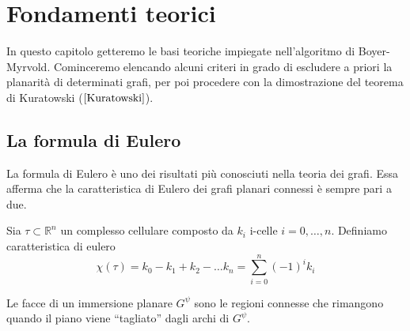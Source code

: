 \chapter{Fondamenti teorici}
In questo capitolo getteremo le basi teoriche impiegate nell'algoritmo di Boyer-Myrvold. Cominceremo elencando alcuni criteri in grado di escludere a priori la planarità di determinati grafi, per poi procedere con la dimostrazione del teorema di Kuratowski (\(\ref{Kuratowski}\)).
\section{La formula di Eulero}
La formula di Eulero è uno dei risultati più conosciuti nella teoria dei grafi. Essa afferma che la caratteristica di Eulero dei grafi planari connessi è sempre pari a due.
\begin{definizione}\label{caratteristica-eulero}
    Sia \(\tau \subset \mathbb{R}^n\) un complesso cellulare composto da \(k_i\) i-celle \(i=0,\dots,n\). Definiamo caratteristica di eulero
    \begin{equation}
        \chi(\tau) = k_0 - k_1 + k_2 - \dots k_n = \sum_{i=0}^{n}{(-1)}^i k_i
    \end{equation}
\end{definizione}
\begin{definizione}[Facce]
    Le facce di un immersione planare \(G^\psi\) sono le regioni connesse che rimangono quando il piano viene “tagliato” dagli archi di \(G^\psi\).
\end{definizione}
